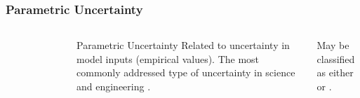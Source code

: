 \begin{frame}
    \frametitle{Parametric Uncertainty}

    \begin{columns}
        \column[t]{4cm}
        \begin{figure}
            \centering
        \end{figure}

        \column[t]{6cm}
        \begin{block}{Parametric Uncertainty}
            Related to uncertainty in model inputs (empirical values). The most
            commonly addressed type of uncertainty in science and engineering
            \cite{yue_review_2018,decarolis_using_2011,morgan_uncertainty_1990}.    
        \end{block}
        
        May be classified as either  or
        \cite{pfenninger_energy_2014,kiureghian_aleatory_2009}. 
    \end{columns}

\end{frame}

